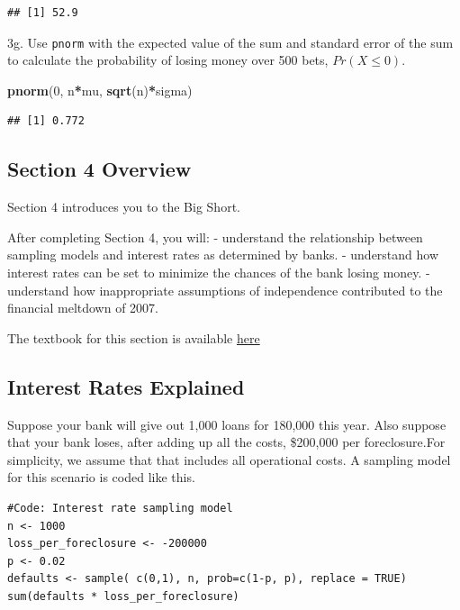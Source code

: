 \documentclass[
]{article}
\newenvironment{Shaded}{\begin{snugshade}}{\end{snugshade}}
\newcommand{\DecValTok}[1]{\textcolor[rgb]{0.00,0.00,0.81}{#1}}
\newcommand{\KeywordTok}[1]{\textcolor[rgb]{0.13,0.29,0.53}{\textbf{#1}}}
\newcommand{\NormalTok}[1]{#1}
\newcommand{\OperatorTok}[1]{\textcolor[rgb]{0.81,0.36,0.00}{\textbf{#1}}}
\begin{document}
\begin{verbatim}
## [1] 52.9
\end{verbatim}

3g. Use \texttt{pnorm} with the expected value of the sum and standard
error of the sum to calculate the probability of losing money over 500
bets, \(Pr(X \le 0)\).

\begin{Shaded}
\begin{Highlighting}[]
\KeywordTok{pnorm}\NormalTok{(}\DecValTok{0}\NormalTok{, n}\OperatorTok{*}\NormalTok{mu, }\KeywordTok{sqrt}\NormalTok{(n)}\OperatorTok{*}\NormalTok{sigma)}
\end{Highlighting}
\end{Shaded}

\begin{verbatim}
## [1] 0.772
\end{verbatim}

\hypertarget{section-4-overview}{%
\subsection{Section 4 Overview}\label{section-4-overview}}

Section 4 introduces you to the Big Short.

After completing Section 4, you will: - understand the relationship
between sampling models and interest rates as determined by banks. -
understand how interest rates can be set to minimize the chances of the
bank losing money. - understand how inappropriate assumptions of
independence contributed to the financial meltdown of 2007.

The textbook for this section is available
\href{https://rafalab.github.io/dsbook/random-variables.html\#case-study-the-big-short}{here}

\hypertarget{interest-rates-explained}{%
\subsection{Interest Rates Explained}\label{interest-rates-explained}}

Suppose your bank will give out 1,000 loans for 180,000 this year. Also
suppose that your bank loses, after adding up all the costs, \$200,000
per foreclosure.For simplicity, we assume that that includes all
operational costs. A sampling model for this scenario is coded like
this.

\begin{verbatim}
#Code: Interest rate sampling model
n <- 1000
loss_per_foreclosure <- -200000
p <- 0.02
defaults <- sample( c(0,1), n, prob=c(1-p, p), replace = TRUE)
sum(defaults * loss_per_foreclosure)
\end{verbatim}
\end{document}
